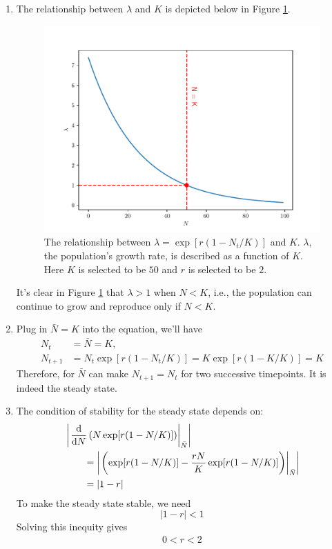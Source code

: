 \begin{homeworkProblem}[4]
\begin{enumerate}
\item The relationship between $\lambda$ and $K$ is depicted below in Figure
\ref{fig:fig4a}.
\begin{figure}
    \centering
    \caption[The relationship between $\lambda$]{
        The relationship between $\lambda = \exp[r(1-N_t/K)]$ and $K$.
        $\lambda$, the population's growth rate, is described as a function of
        $K$. Here $K$ is selected to be $50$ and $r$ is selected to be $2$.
    }
    \label{fig:fig4a}
    \includegraphics[scale=0.4]{fig/fig4(a).pdf}
\end{figure}
It's clear in Figure \ref{fig:fig4a} that $\lambda > 1$ when $N < K$, i.e., the
population can continue to grow and reproduce only if $N < K$.

\item Plug in $\bar N = K$ into the equation, we'll have \[
    \begin{aligned}
        N_t &= \bar N = K,\\
        N_{t+1} &= N_t \exp[r(1-N_t/K)] = K \exp[r(1-K/K)] = K
    \end{aligned}
\]
Therefore, for $\bar N$ can make $N_{t+1} = N_t$ for two successive timepoints.
It is indeed the steady state.

\item The condition of stability for the steady state depends on: \[
    \begin{aligned}
        &\left|\left.\derivlong[N]{N\exp[r(1-N/K)]}\right|_{\bar N}\right|\\
        &\qquad = \left| \left.\left(
            \exp[r(1-N/K)] - \frac{rN}{K} \exp[r(1-N/K)]
        \right)\right|_{\bar N} \right|\\
        &\qquad = |1 - r|
    \end{aligned}
\]
To make the steady state stable, we need \[
    |1-r| < 1
\]
Solving this inequity gives \[
    \begin{aligned}
        0 < r < 2
    \end{aligned}
\]


\end{enumerate}
\end{homeworkProblem}
